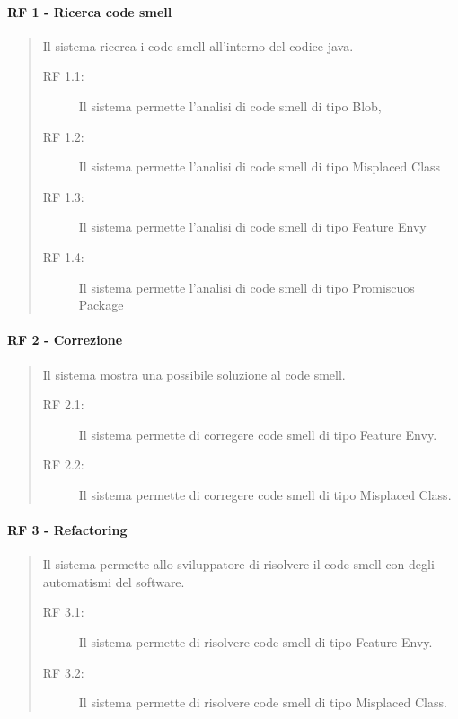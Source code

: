 		\paragraph{RF 1 - Ricerca code smell} 
		\begin{quote}Il sistema ricerca i code smell all'interno del codice java.	\begin{description}
				\item [RF 1.1:]Il sistema permette l'analisi di code smell di tipo Blob,
				\item [RF 1.2:]Il sistema permette l'analisi di code smell di tipo Misplaced Class
				\item [RF 1.3:]Il sistema permette l'analisi di code smell di tipo Feature Envy
				\item [RF 1.4:]Il sistema permette l'analisi di code smell di tipo Promiscuos Package
		\end{description}\end{quote}
	
		
		
		\paragraph{RF 2 - Correzione} 
		\begin{quote}Il sistema mostra una possibile soluzione al code smell.\begin{description}
				\item [RF 2.1:] Il sistema permette di corregere code smell di tipo Feature Envy.
				\item [RF 2.2:] Il sistema permette di corregere code smell di tipo Misplaced Class.
		\end{description}\end{quote}
		
		
		\paragraph{RF 3 - Refactoring} 
		\begin{quote}Il sistema permette allo sviluppatore di risolvere il code smell con degli automatismi del software.\begin{description}
				\item [RF 3.1:] Il sistema permette di risolvere code smell di tipo Feature Envy.
				\item [RF 3.2:] Il sistema permette di risolvere code smell di tipo Misplaced Class.
		\end{description}\end{quote}
		
